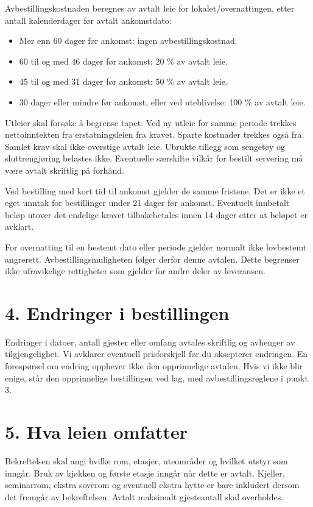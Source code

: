 \documentclass[12pt,a4paper]{article}
\begin{document}
Avbestillingskostnaden beregnes av avtalt leie for lokalet/overnattingen, etter antall kalenderdager før avtalt ankomstdato:

\begin{itemize}
\item Mer enn 60 dager før ankomst: ingen avbestillingskostnad.
\item 60 til og med 46 dager før ankomst: 20 \% av avtalt leie.
\item 45 til og med 31 dager før ankomst: 50 \% av avtalt leie.
\item 30 dager eller mindre før ankomst, eller ved uteblivelse: 100 \% av avtalt leie.
\end{itemize}
Utleier skal forsøke å begrense tapet. Ved ny utleie for samme periode trekkes nettoinntekten fra erstatningsleien fra kravet. Sparte kostnader trekkes også fra. Samlet krav skal ikke overstige avtalt leie. Ubrukte tillegg som sengetøy og sluttrengjøring belastes ikke. Eventuelle særskilte vilkår for bestilt servering må være avtalt skriftlig på forhånd.

Ved bestilling med kort tid til ankomst gjelder de samme fristene. Det er ikke et eget unntak for bestillinger under 21 dager før ankomst. Eventuelt innbetalt beløp utover det endelige kravet tilbakebetales innen 14 dager etter at beløpet er avklart.

For overnatting til en bestemt dato eller periode gjelder normalt ikke lovbestemt angrerett. Avbestillingsmuligheten følger derfor denne avtalen. Dette begrenser ikke ufravikelige rettigheter som gjelder for andre deler av leveransen.


\section{4. Endringer i bestillingen}
Endringer i datoer, antall gjester eller omfang avtales skriftlig og avhenger av tilgjengelighet. Vi avklarer eventuell prisforskjell før du aksepterer endringen. En forespørsel om endring opphever ikke den opprinnelige avtalen. Hvis vi ikke blir enige, står den opprinnelige bestillingen ved lag, med avbestillingsreglene i punkt 3.


\section{5. Hva leien omfatter}
Bekreftelsen skal angi hvilke rom, etasjer, uteområder og hvilket utstyr som inngår. Bruk av kjøkken og første etasje inngår når dette er avtalt. Kjeller, seminarrom, ekstra soverom og eventuell ekstra hytte er bare inkludert dersom det fremgår av bekreftelsen. Avtalt maksimalt gjesteantall skal overholdes.
\end{document}
